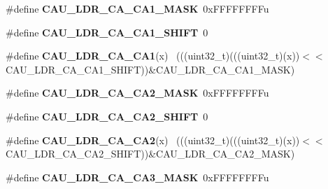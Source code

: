 \begin{DoxyCompactItemize}
\item 
\hypertarget{group___c_a_u___register___masks_ga5dac734b52c32cbb41f3daafa6d85e9e}{}\#define {\bfseries C\+A\+U\+\_\+\+L\+D\+R\+\_\+\+C\+A\+\_\+\+C\+A1\+\_\+\+M\+A\+S\+K}~0x\+F\+F\+F\+F\+F\+F\+F\+Fu\label{group___c_a_u___register___masks_ga5dac734b52c32cbb41f3daafa6d85e9e}

\item 
\hypertarget{group___c_a_u___register___masks_ga7c6e3a6f8d94f1b39d9f6334d6916b64}{}\#define {\bfseries C\+A\+U\+\_\+\+L\+D\+R\+\_\+\+C\+A\+\_\+\+C\+A1\+\_\+\+S\+H\+I\+F\+T}~0\label{group___c_a_u___register___masks_ga7c6e3a6f8d94f1b39d9f6334d6916b64}

\item 
\hypertarget{group___c_a_u___register___masks_ga933d5a5547216275da26c24819a25c31}{}\#define {\bfseries C\+A\+U\+\_\+\+L\+D\+R\+\_\+\+C\+A\+\_\+\+C\+A1}(x)                                            ~(((uint32\+\_\+t)(((uint32\+\_\+t)(x))$<$$<$C\+A\+U\+\_\+\+L\+D\+R\+\_\+\+C\+A\+\_\+\+C\+A1\+\_\+\+S\+H\+I\+F\+T))\&C\+A\+U\+\_\+\+L\+D\+R\+\_\+\+C\+A\+\_\+\+C\+A1\+\_\+\+M\+A\+S\+K)\label{group___c_a_u___register___masks_ga933d5a5547216275da26c24819a25c31}

\item 
\hypertarget{group___c_a_u___register___masks_gada0be8752ff081d41bd530392613175b}{}\#define {\bfseries C\+A\+U\+\_\+\+L\+D\+R\+\_\+\+C\+A\+\_\+\+C\+A2\+\_\+\+M\+A\+S\+K}~0x\+F\+F\+F\+F\+F\+F\+F\+Fu\label{group___c_a_u___register___masks_gada0be8752ff081d41bd530392613175b}

\item 
\hypertarget{group___c_a_u___register___masks_gaf922a639148e6bfa357029f20b0d1aef}{}\#define {\bfseries C\+A\+U\+\_\+\+L\+D\+R\+\_\+\+C\+A\+\_\+\+C\+A2\+\_\+\+S\+H\+I\+F\+T}~0\label{group___c_a_u___register___masks_gaf922a639148e6bfa357029f20b0d1aef}

\item 
\hypertarget{group___c_a_u___register___masks_ga586cf715d41c46cc3e099aad68fcef14}{}\#define {\bfseries C\+A\+U\+\_\+\+L\+D\+R\+\_\+\+C\+A\+\_\+\+C\+A2}(x)                                            ~(((uint32\+\_\+t)(((uint32\+\_\+t)(x))$<$$<$C\+A\+U\+\_\+\+L\+D\+R\+\_\+\+C\+A\+\_\+\+C\+A2\+\_\+\+S\+H\+I\+F\+T))\&C\+A\+U\+\_\+\+L\+D\+R\+\_\+\+C\+A\+\_\+\+C\+A2\+\_\+\+M\+A\+S\+K)\label{group___c_a_u___register___masks_ga586cf715d41c46cc3e099aad68fcef14}

\item 
\hypertarget{group___c_a_u___register___masks_gadc483f48a51a7e423bd122f4175d4dd8}{}\#define {\bfseries C\+A\+U\+\_\+\+L\+D\+R\+\_\+\+C\+A\+\_\+\+C\+A3\+\_\+\+M\+A\+S\+K}~0x\+F\+F\+F\+F\+F\+F\+F\+Fu\label{group___c_a_u___register___masks_gadc483f48a51a7e423bd122f4175d4dd8}


\end{DoxyCompactItemize}
